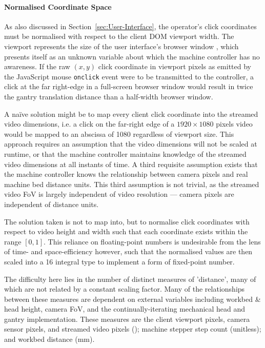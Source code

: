 \documentclass[12pt,british,UKenglish]{article}
\begin{document}
\paragraph{Normalised Coordinate Space}
As also discussed in Section~\ref{sec:User-Interface}, the operator's click coordinates must be normalised with respect to the client \ac*{DOM} viewport width.
The viewport represents the size of the user interface's browser window \cite{mozillaViewportConcepts}, which presents itself as an unknown variable about which the machine controller has no awareness.
If the raw $(x, y)$ click coordinate in viewport pixels as emitted by the JavaScript mouse \texttt{onclick} event were to be transmitted to the controller, a click at the far right-edge in a full-screen browser window would result in twice the gantry translation distance than a half-width browser window.

A naïve solution might be to map every client click coordinate into the streamed video dimensions, i.e. a click on the far-right edge of a $1920\times1080$ pixels video would be mapped to an abscissa of \qty{1080}{\px} regardless of viewport size.
This approach requires an assumption that the video dimensions will not be scaled at runtime, or that the machine controller maintains knowledge of the streamed video dimensions at all instants of time.
A third requisite assumption exists that the machine controller knows the relationship between camera pixels and real machine bed distance units.
This third assumption is not trivial, as the streamed video \ac{FoV} is largely independent of video resolution --- camera pixels are independent of distance units.

The solution taken is not to map into, but to normalise click coordinates with respect to video height and width such that each coordinate exists within the range $[0, 1]$.
This reliance on floating-point numbers is undesirable from the lens of time- and space-efficiency however, such that the normalised values are then scaled into a \qty{16}{\bit} integral type to implement a form of fixed-point number.

The difficulty here lies in the number of distinct measures of 'distance', many of which are not related by a constant scaling factor.
Many of the relationships between these measures are dependent on external variables including workbed \& head height, camera \ac{FoV}, and the continually-iterating mechanical head and gantry implementation.
These measures are the client viewport pixels, camera sensor pixels, and streamed video pixels (\unit{\px}); machine stepper step count (unitless); and workbed distance (\unit{\milli\metre}).
\end{document}

